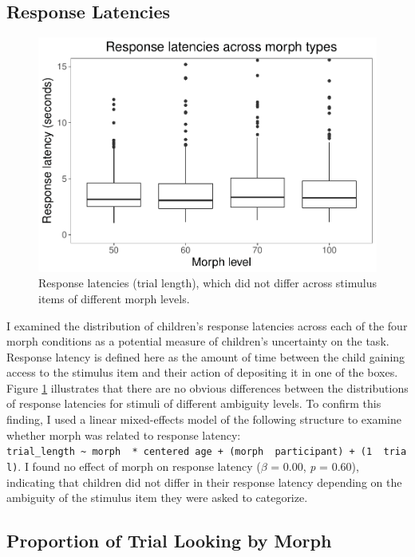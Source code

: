 \documentclass[floatsintext,man]{apa6}
\theoremstyle{definition}
\theoremstyle{definition}
\theoremstyle{definition}
\theoremstyle{remark}
\begin{document}
\subsection{Response Latencies}\label{response-latencies}

\begin{figure}
\centering
\includegraphics{soc_ref_category_paper_files/figure-latex/latencies-1.pdf}
\caption{\label{fig:latencies}Response latencies (trial length), which did
not differ across stimulus items of different morph levels.}
\end{figure}

I examined the distribution of children's response latencies across each
of the four morph conditions as a potential measure of children's
uncertainty on the task. Response latency is defined here as the amount
of time between the child gaining access to the stimulus item and their
action of depositing it in one of the boxes. Figure \ref{fig:latencies}
illustrates that there are no obvious differences between the
distributions of response latencies for stimuli of different ambiguity
levels. To confirm this finding, I used a linear mixed-effects model of
the following structure to examine whether morph was related to response
latency:
\texttt{trial\_length\ \textasciitilde{}\ morph\ \ *\ centered\ age\ +\ (morph\ \textbar{}\ participant)\ +\ (1\ \textbar{}\ trial)}.
I found no effect of morph on response latency (\(\beta\) = 0.00,
\emph{p} = 0.60), indicating that children did not differ in their
response latency depending on the ambiguity of the stimulus item they
were asked to categorize.

\subsection{Proportion of Trial Looking by
Morph}\label{proportion-of-trial-looking-by-morph}
\end{document}
